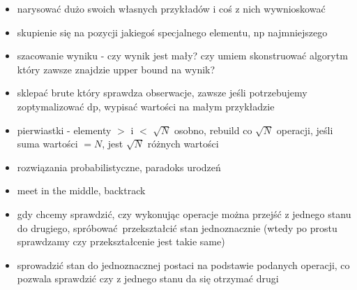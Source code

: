 \begin{itemize}[noitemsep]
	\item narysować dużo swoich własnych przykładów i coś z nich wywnioskować
	\item skupienie się na pozycji jakiegoś specjalnego elementu, np najmniejszego
	\item szacowanie wyniku - czy wynik jest mały? czy umiem skonstruować algorytm który zawsze znajdzie upper bound na wynik?
	\item sklepać brute który sprawdza obserwacje, zawsze jeśli potrzebujemy zoptymalizować dp, wypisać wartości na małym przykładzie
	\item pierwiastki - elementy $>$ i $<$ $\sqrt{N}$ osobno, rebuild co $\sqrt{N}$ operacji, jeśli suma wartości $=N$, jest $\sqrt{N}$ różnych wartości
	\item rozwiązania probabilistyczne, paradoks urodzeń
	\item meet in the middle, backtrack
	\item gdy chcemy sprawdzić, czy wykonując operacje można przejść z jednego stanu do drugiego, spróbować przekształcić stan jednoznacznie (wtedy po prostu sprawdzamy czy przekształcenie jest takie same)
	\item sprowadzić stan do jednoznacznej postaci na podstawie podanych operacji, co pozwala sprawdzić czy z jednego stanu da się otrzymać drugi
\end{itemize}
